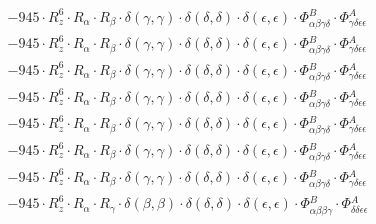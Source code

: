 \documentclass{article}
\begin{document}
\begin{subequations}
\begin{gather}
\begin{array}{c}
 \\[0.2em] 		 - 945 \cdot R_{z}^{6} \cdot R_{\alpha{}} \cdot R_{\beta{}} \cdot \delta{}\left(\gamma{}, \gamma{}\right) \cdot \delta{}\left(\delta{}, \delta{}\right) \cdot \delta{}\left(\epsilon{}, \epsilon{}\right) \cdot \Phi{}^{B}_{\alpha{}\beta{}\gamma{}\delta{}} \cdot \Phi{}^{A}_{\gamma{}\delta{}\epsilon{}\epsilon{}} 
 \\[0.2em] 		 - 945 \cdot R_{z}^{6} \cdot R_{\alpha{}} \cdot R_{\beta{}} \cdot \delta{}\left(\gamma{}, \gamma{}\right) \cdot \delta{}\left(\delta{}, \delta{}\right) \cdot \delta{}\left(\epsilon{}, \epsilon{}\right) \cdot \Phi{}^{B}_{\alpha{}\beta{}\gamma{}\delta{}} \cdot \Phi{}^{A}_{\gamma{}\delta{}\epsilon{}\epsilon{}} 
 \\[0.2em] 		 - 945 \cdot R_{z}^{6} \cdot R_{\alpha{}} \cdot R_{\beta{}} \cdot \delta{}\left(\gamma{}, \gamma{}\right) \cdot \delta{}\left(\delta{}, \delta{}\right) \cdot \delta{}\left(\epsilon{}, \epsilon{}\right) \cdot \Phi{}^{B}_{\alpha{}\beta{}\gamma{}\delta{}} \cdot \Phi{}^{A}_{\gamma{}\delta{}\epsilon{}\epsilon{}} 
 \\[0.2em] 		 - 945 \cdot R_{z}^{6} \cdot R_{\alpha{}} \cdot R_{\beta{}} \cdot \delta{}\left(\gamma{}, \gamma{}\right) \cdot \delta{}\left(\delta{}, \delta{}\right) \cdot \delta{}\left(\epsilon{}, \epsilon{}\right) \cdot \Phi{}^{B}_{\alpha{}\beta{}\gamma{}\delta{}} \cdot \Phi{}^{A}_{\gamma{}\delta{}\epsilon{}\epsilon{}} 
 \\[0.2em] 		 - 945 \cdot R_{z}^{6} \cdot R_{\alpha{}} \cdot R_{\beta{}} \cdot \delta{}\left(\gamma{}, \gamma{}\right) \cdot \delta{}\left(\delta{}, \delta{}\right) \cdot \delta{}\left(\epsilon{}, \epsilon{}\right) \cdot \Phi{}^{B}_{\alpha{}\beta{}\gamma{}\delta{}} \cdot \Phi{}^{A}_{\gamma{}\delta{}\epsilon{}\epsilon{}} 
 \\[0.2em] 		 - 945 \cdot R_{z}^{6} \cdot R_{\alpha{}} \cdot R_{\beta{}} \cdot \delta{}\left(\gamma{}, \gamma{}\right) \cdot \delta{}\left(\delta{}, \delta{}\right) \cdot \delta{}\left(\epsilon{}, \epsilon{}\right) \cdot \Phi{}^{B}_{\alpha{}\beta{}\gamma{}\delta{}} \cdot \Phi{}^{A}_{\gamma{}\delta{}\epsilon{}\epsilon{}} 
 \\[0.2em] 		 - 945 \cdot R_{z}^{6} \cdot R_{\alpha{}} \cdot R_{\beta{}} \cdot \delta{}\left(\gamma{}, \gamma{}\right) \cdot \delta{}\left(\delta{}, \delta{}\right) \cdot \delta{}\left(\epsilon{}, \epsilon{}\right) \cdot \Phi{}^{B}_{\alpha{}\beta{}\gamma{}\delta{}} \cdot \Phi{}^{A}_{\gamma{}\delta{}\epsilon{}\epsilon{}} 
 \\[0.2em] 		 - 945 \cdot R_{z}^{6} \cdot R_{\alpha{}} \cdot R_{\gamma{}} \cdot \delta{}\left(\beta{}, \beta{}\right) \cdot \delta{}\left(\delta{}, \delta{}\right) \cdot \delta{}\left(\epsilon{}, \epsilon{}\right) \cdot \Phi{}^{B}_{\alpha{}\beta{}\beta{}\gamma{}} \cdot \Phi{}^{A}_{\delta{}\delta{}\epsilon{}\epsilon{}} 

\end{array}
\end{gather}
\end{subequations}
\end{document}
